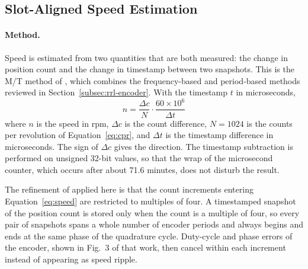 
\subsection{Slot-Aligned Speed Estimation}
\label{subsec:agit-cet}

\paragraph{Method.}
Speed is estimated from two quantities that are both measured: the change in position count and the change in timestamp between two snapshots. This is the M/T method of \citet{bonert1983}, which combines the frequency-based and period-based methods reviewed in Section~\ref{subsec:rrl-encoder}. With the timestamp $t$ in microseconds,
\begin{equation}
    n = \frac{\Delta c}{N} \cdot \frac{60 \times 10^{6}}{\Delta t}
    \label{eq:speed}
\end{equation}
where $n$ is the speed in rpm, $\Delta c$ is the count difference, $N = 1024$ is the counts per revolution of Equation~\ref{eq:cpr}, and $\Delta t$ is the timestamp difference in microseconds. The sign of $\Delta c$ gives the direction. The timestamp subtraction is performed on unsigned 32-bit values, so that the wrap of the microsecond counter, which occurs after about 71.6 minutes, does not disturb the result.

The refinement of \citet{anuchin2019} applied here is that the count increments entering Equation~\ref{eq:speed} are restricted to multiples of four. A timestamped snapshot of the position count is stored only when the count is a multiple of four, so every pair of snapshots spans a whole number of encoder periods and always begins and ends at the same phase of the quadrature cycle. Duty-cycle and phase errors of the encoder, shown in Fig.~3 of that work, then cancel within each increment instead of appearing as speed ripple.

